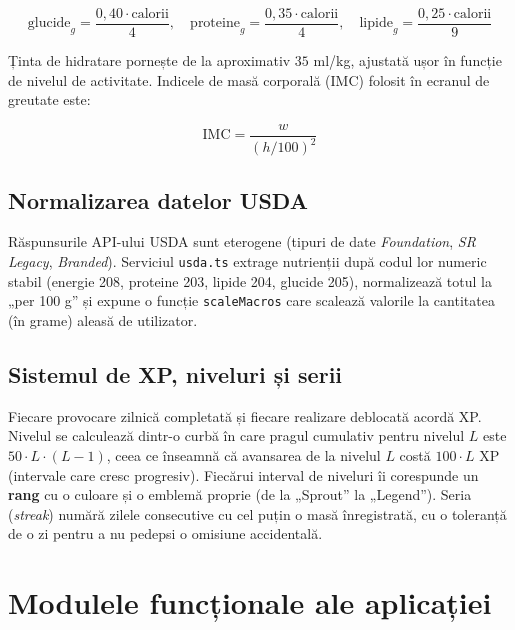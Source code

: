 \documentclass[12pt, a4paper, twoside]{report}
\numberwithin{equation}{section}
\begin{document}
\begin{equation}
\text{glucide}_g = \frac{0{,}40 \cdot \text{calorii}}{4}, \quad
\text{proteine}_g = \frac{0{,}35 \cdot \text{calorii}}{4}, \quad
\text{lipide}_g = \frac{0{,}25 \cdot \text{calorii}}{9}
\end{equation}

Ținta de hidratare pornește de la aproximativ $35$ ml/kg, ajustată ușor în funcție de
nivelul de activitate. Indicele de masă corporală (IMC) folosit în ecranul de greutate este:

\begin{equation}
\text{IMC} = \frac{w}{(h/100)^2}
\end{equation}

\section{Normalizarea datelor USDA}

Răspunsurile API-ului USDA sunt eterogene (tipuri de date \textit{Foundation}, \textit{SR
Legacy}, \textit{Branded}). Serviciul \texttt{usda.ts} extrage nutrienții după codul lor
numeric stabil (energie 208, proteine 203, lipide 204, glucide 205), normalizează totul la
„per 100 g'' și expune o funcție \texttt{scaleMacros} care scalează valorile la cantitatea
(în grame) aleasă de utilizator.

\section{Sistemul de XP, niveluri și serii}

Fiecare provocare zilnică completată și fiecare realizare deblocată acordă XP. Nivelul se
calculează dintr-o curbă în care pragul cumulativ pentru nivelul $L$ este
$50 \cdot L \cdot (L-1)$, ceea ce înseamnă că avansarea de la nivelul $L$ costă $100 \cdot L$
XP (intervale care cresc progresiv). Fiecărui interval de niveluri îi corespunde un
\textbf{rang} cu o culoare și o emblemă proprie (de la „Sprout'' la „Legend''). Seria
(\textit{streak}) numără zilele consecutive cu cel puțin o masă înregistrată, cu o toleranță
de o zi pentru a nu pedepsi o omisiune accidentală.

\chapter{Modulele funcționale ale aplicației}
\end{document}
